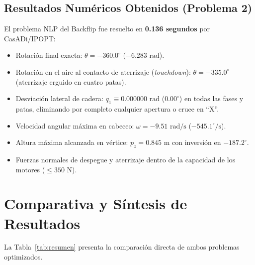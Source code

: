 \documentclass[11pt,a4paper]{article}
\begin{document}
\subsection{Resultados Numéricos Obtenidos (Problema 2)}
El problema NLP del Backflip fue resuelto en \textbf{0.136 segundos} por CasADi/IPOPT:
\begin{itemize}
    \item Rotación final exacta: $\theta = -360.0^\circ$ ($-6.283\text{ rad}$).
    \item Rotación en el aire al contacto de aterrizaje (\textit{touchdown}): $\theta = -335.0^\circ$ (aterrizaje erguido en cuatro patas).
    \item Desviación lateral de cadera: $q_1 \equiv 0.000000\text{ rad}$ ($0.00^\circ$) en todas las fases y patas, eliminando por completo cualquier apertura o cruce en ``X''.
    \item Velocidad angular máxima en cabeceo: $\omega = -9.51\text{ rad/s}$ ($-545.1^\circ/\text{s}$).
    \item Altura máxima alcanzada en vértice: $p_z = 0.845\text{ m}$ con inversión en $-187.2^\circ$.
    \item Fuerzas normales de despegue y aterrizaje dentro de la capacidad de los motores ($\le 350\text{ N}$).
\end{itemize}

\section{Comparativa y Síntesis de Resultados}
La Tabla~\ref{tab:resumen} presenta la comparación directa de ambos problemas optimizados.
\end{document}
